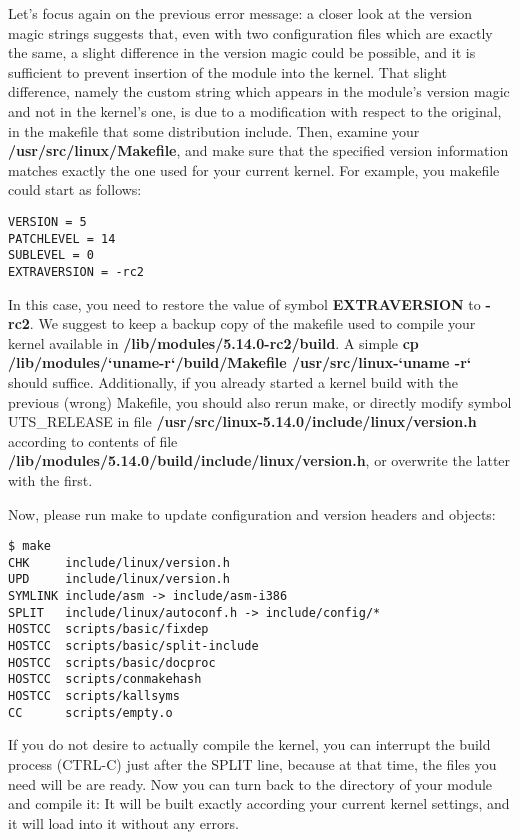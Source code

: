 \documentclass[10pt, oneside]{book}
\begin{document}
Let's focus again on the previous error message: a closer look at the version magic strings suggests that, even with two configuration files which are exactly the same, a slight difference in the version magic could be possible, and it is sufficient to prevent insertion of the module into the kernel.
That slight difference, namely the custom string which appears in the module's version magic and not in the kernel's one, is due to a modification with respect to the original, in the makefile that some distribution include.
Then, examine your \textbf{/usr/src/linux/Makefile}, and make sure that the specified version information matches exactly the one used for your current kernel. For example, you makefile could start as follows:

\begin{verbatim}
VERSION = 5
PATCHLEVEL = 14
SUBLEVEL = 0
EXTRAVERSION = -rc2
\end{verbatim}

In this case, you need to restore the value of symbol \textbf{EXTRAVERSION} to \textbf{-rc2}.
We suggest to keep a backup copy of the makefile used to compile your kernel available in \textbf{/lib/modules/5.14.0-rc2/build}.
A simple \textbf{cp /lib/modules/`uname-r`/build/Makefile /usr/src/linux-`uname -r`} should suffice.
Additionally, if you already started a kernel build with the previous (wrong) Makefile, you should also rerun make, or directly modify symbol UTS\_RELEASE in file \textbf{/usr/src/linux-5.14.0/include/linux/version.h} according to contents of file \textbf{/lib/modules/5.14.0/build/include/linux/version.h}, or overwrite the latter with the first.

Now, please run make to update configuration and version headers and objects:

\begin{verbatim}
$ make
CHK     include/linux/version.h
UPD     include/linux/version.h
SYMLINK include/asm -> include/asm-i386
SPLIT   include/linux/autoconf.h -> include/config/*
HOSTCC  scripts/basic/fixdep
HOSTCC  scripts/basic/split-include
HOSTCC  scripts/basic/docproc
HOSTCC  scripts/conmakehash
HOSTCC  scripts/kallsyms
CC      scripts/empty.o
\end{verbatim}

If you do not desire to actually compile the kernel, you can interrupt the build process (CTRL-C) just after the SPLIT line, because at that time, the files you need will be are ready.
Now you can turn back to the directory of your module and compile it: It will be built exactly according your current kernel settings, and it will load into it without any errors.
\end{document}
